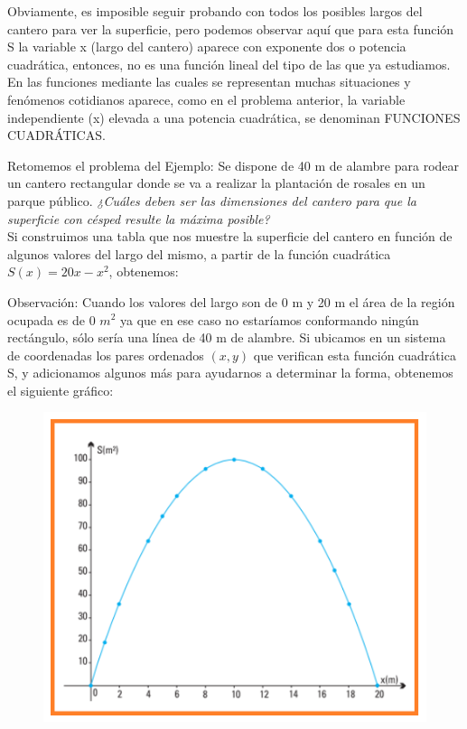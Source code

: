 \documentclass[a4paper,10pt,BCOR10mm,oneside,headsepline]{scrbook}
\begin{document}
Obviamente, es imposible seguir probando con todos los posibles largos del cantero para ver la superficie, pero podemos observar aquí que para esta función S la variable x (largo del cantero) aparece con exponente dos o potencia cuadrática, entonces, no es una función lineal del tipo de las que ya estudiamos.
En las funciones mediante las cuales se representan muchas situaciones y fenómenos cotidianos aparece, como en el problema anterior, la variable independiente (x) elevada a una potencia cuadrática, se denominan FUNCIONES CUADRÁTICAS.

Retomemos el problema del Ejemplo:
Se dispone de 40 m de alambre para rodear un cantero rectangular donde se va a realizar la plantación de rosales en un parque público. \textit{¿Cuáles deben ser las dimensiones del cantero para que la superficie con césped resulte la máxima posible?}\\
Si construimos una tabla que nos muestre la superficie del cantero en función de algunos valores del largo del mismo, a partir de la función cuadrática $S(x) =20x-x^{2}$, obtenemos:


Observación: Cuando los valores del largo son de 0 m y 20 m el área de la región ocupada es de 0 $m^2$ ya que en ese caso no estaríamos conformando ningún rectángulo, sólo sería una línea de 40 m de alambre.
Si ubicamos en un sistema de coordenadas los pares ordenados $(x,y)$ que verifican esta
función cuadrática S, y adicionamos algunos más para ayudarnos a determinar la forma, obtenemos el siguiente gráfico:

\begin{figure}[h!]
	\centering
	\includegraphics[width=0.45\linewidth]{cuadratica1.png}
\end{figure}
\end{document}
